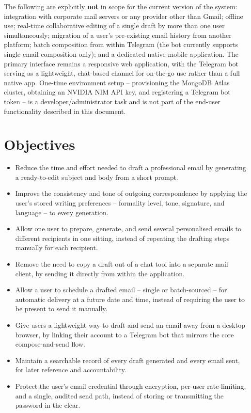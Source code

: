 \documentclass[12pt,a4paper]{article}
\begin{document}
The following are explicitly \textbf{not} in scope for the current version of the system: integration with corporate mail servers or any provider other than Gmail; offline use; real-time collaborative editing of a single draft by more than one user simultaneously; migration of a user's pre-existing email history from another platform; batch composition from within Telegram (the bot currently supports single-email composition only); and a dedicated native mobile application. The primary interface remains a responsive web application, with the Telegram bot serving as a lightweight, chat-based channel for on-the-go use rather than a full native app. One-time environment setup -- provisioning the MongoDB Atlas cluster, obtaining an NVIDIA NIM API key, and registering a Telegram bot token -- is a developer/administrator task and is not part of the end-user functionality described in this document.

\section{Objectives}

\begin{itemize}[leftmargin=22pt]
  \item Reduce the time and effort needed to draft a professional email by generating a ready-to-edit subject and body from a short prompt.
  \item Improve the consistency and tone of outgoing correspondence by applying the user's stored writing preferences -- formality level, tone, signature, and language -- to every generation.
  \item Allow one user to prepare, generate, and send several personalised emails to different recipients in one sitting, instead of repeating the drafting steps manually for each recipient.
  \item Remove the need to copy a draft out of a chat tool into a separate mail client, by sending it directly from within the application.
  \item Allow a user to schedule a drafted email -- single or batch-sourced -- for automatic delivery at a future date and time, instead of requiring the user to be present to send it manually.
  \item Give users a lightweight way to draft and send an email away from a desktop browser, by linking their account to a Telegram bot that mirrors the core compose-and-send flow.
  \item Maintain a searchable record of every draft generated and every email sent, for later reference and accountability.
  \item Protect the user's email credential through encryption, per-user rate-limiting, and a single, audited send path, instead of storing or transmitting the password in the clear.
\end{itemize}
\end{document}
